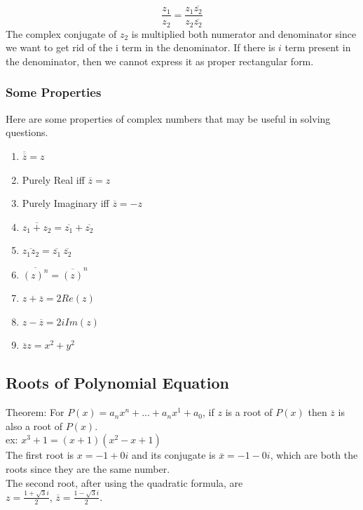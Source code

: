 \documentclass[12pt]{article}
\begin{document}
\begin{equation}
\frac{z_1}{z_2} = \frac{z_1\overline{z_2}}{z_2\overline{z_2}}
\end{equation}
The complex conjugate of $z_2$ is multiplied both numerator and denominator since we want to get rid of the i term in the denominator. If there is $i$ term present in the denominator, then we cannot express it as proper rectangular form.

\subsubsection{Some Properties}
Here are some properties of complex numbers that may be useful in solving questions.\\
\begin{enumerate}
\item $\overline{\overline{z}} = z$ 
\item Purely Real iff $\overline{z} = z$
\item Purely Imaginary iff $\overline{z} = -z$
\item $\overline{z_1+z_2} = \overline{z_1} + \overline{z_2}$
\item $\overline{z_1z_2} = \overline{z_1}\:\overline{z_2}$
\item $\overline{(z)^n} = \overline{(z)}^n$
\item $z + \overline{z} = 2Re(z)$
\item $z - \overline{z} = 2iIm(z)$
\item $\overline{z}z = x^2 + y^2$
\end{enumerate} \cite{Textbook}

\subsection{Roots of Polynomial Equation}
Theorem: For $P(x) =a_nx^n + ... + a_nx^1+a_0$, if $z$ is a root of $P(x)$ then $\overline{z}$ is also a root of $P(x)$.\\
ex: $x^3 + 1= (x+1)(x^2-x+1)$ \\
The first root is $x = -1 + 0i$ and its conjugate is $\overline{x} = -1 -0i$, which are both the roots since they are the same number.\\
The second root, after using the quadratic formula, are\\
$z = \frac{1+\sqrt{3}i}{2}$, $\overline{z} = \frac{1-\sqrt{3}i}{2}$.\\
\end{document}
